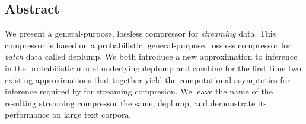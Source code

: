 \subsection*{Abstract}

We present a general-purpose, lossless compressor for {\em streaming} data.  This compressor is based on a probabilistic, general-purpose, lossless compressor for {\em batch} data called deplump.  We both introduce a new approximation to inference in the probabilistic model underlying deplump and combine for the first time two existing approximations that together yield the computational asymptotics for inference required by for streaming compresion.  We leave the name of the resulting streaming compressor the same, deplump, and demonstrate its performance on large text corpora.